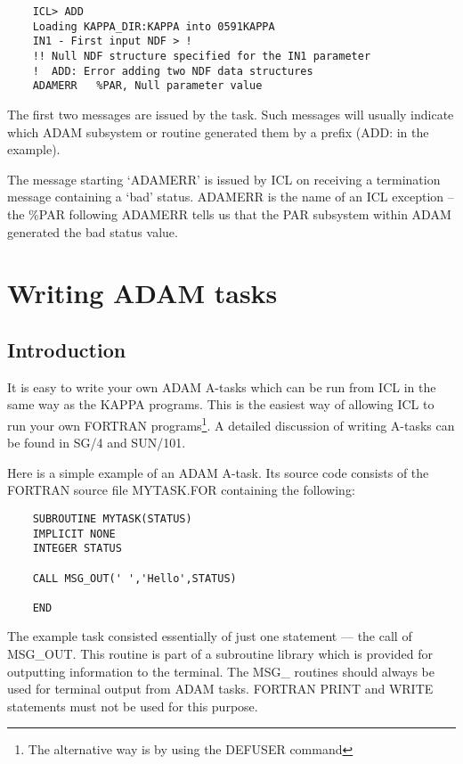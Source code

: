 \documentclass[twoside,11pt]{report}
\newcommand{\xlabel}[1]{}
\begin{document}
\begin{verbatim}
    ICL> ADD
    Loading KAPPA_DIR:KAPPA into 0591KAPPA
    IN1 - First input NDF > !
    !! Null NDF structure specified for the IN1 parameter
    !  ADD: Error adding two NDF data structures
    ADAMERR   %PAR, Null parameter value
\end{verbatim}

The first two messages are issued by the task. Such messages will usually
indicate which ADAM subsystem or routine generated them by a prefix (ADD:
in the example).

The message starting `ADAMERR' is issued by ICL on receiving a termination
message containing a `bad' status.
ADAMERR is the name of an ICL exception -- the \%PAR following ADAMERR tells
us that the PAR subsystem within ADAM generated the bad status value.


\chapter{\xlabel{writing_adam_tasks}Writing ADAM tasks}

\section{\xlabel{introduction}Introduction}

It is easy to write your own ADAM A-tasks which can be run from ICL in the
same way as the KAPPA programs. This is the easiest way of allowing ICL
to run your own FORTRAN programs\footnote{The alternative way is by using
the DEFUSER command}.
A detailed discussion of writing A-tasks can be found in SG/4 and SUN/101.

Here is a simple example of an ADAM A-task. Its source code consists of
the FORTRAN source file MYTASK.FOR containing the following:

\begin{verbatim}
    SUBROUTINE MYTASK(STATUS)
    IMPLICIT NONE
    INTEGER STATUS

    CALL MSG_OUT(' ','Hello',STATUS)

    END
\end{verbatim}
The example task consisted essentially of just one statement --- the call
of MSG\_OUT. This routine is part of a subroutine library which is provided
for outputting information to the terminal. The MSG\_ routines should always
be used for terminal output from ADAM tasks. FORTRAN PRINT and WRITE statements
must not be used for this purpose.
\end{document}

